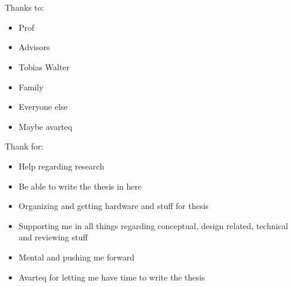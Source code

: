 \section*{}

Thanks to:
\begin{itemize}
\item Prof
\item Advisors
\item Tobias Walter
\item Family
\item Everyone else
\item Maybe avarteq
\end{itemize}

Thank for:
\begin{itemize}
\item Help regarding research
\item Be able to write the thesis in here
\item Organizing and getting hardware and stuff for thesis
\item Supporting me in all things regarding conceptual, design related, technical and reviewing stuff
\item Mental and pushing me forward
\item Avarteq for letting me have time to write the thesis
\end{itemize}
